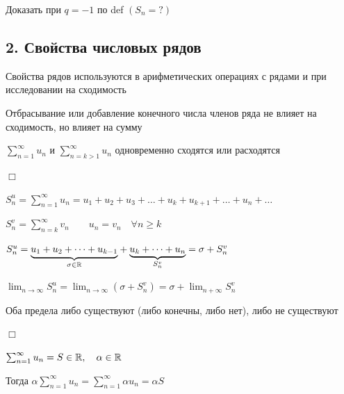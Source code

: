 \documentclass[12pt]{article}
\begin{document}
    \Lab Доказать при $q = -1$ по def $(S_n = ?)$\

    \hypertarget{seriesproperties}{}

    \subsection{2. Свойства числовых рядов}

    \Notas Свойства рядов используются в арифметических операциях с рядами и при исследовании на сходимость

    \begin{MyTheorem}
         Отбрасывание или добавление конечного числа членов ряда не влияет на сходимость, но влияет на сумму

        $\sum_{n = 1}^\infty u_n$ и $\sum_{n = k > 1}^\infty u_n$ одновременно сходятся или расходятся
    \end{MyTheorem}

    \begin{tcolorbox}
        $\Box$

        $S^u_n = \sum_{n = 1}^{\infty} u_n = u_1 + u_2 + u_3 + \dots + u_k + u_{k + 1} + \dots + u_n + \dots$

        $S^v_n = \sum_{n = k}^\infty v_n \quad\quad u_n = v_n \quad \forall n \geq k$

        $S_n^u = \underset{\sigma \in \mathbb{R}}{\underbrace{u_1 + u_2 + \dots + u_{k - 1}}} + \underset{S^v_n}{\underbrace{u_{k} + \dots + u_n}} = \sigma + S^v_n$

        $\lim_{n \to \infty} S_n^u = \lim_{n \to \infty} (\sigma + S^v_n) = \sigma + \lim_{n + \infty} S_n^v$

        \smallvspace

        Оба предела либо существуют (либо конечны, либо нет), либо не существуют



        $\Box$
    \end{tcolorbox}

    \begin{MyTheorem}
         $\sum_{n = 1}^\infty u_n = S \in \mathbb{R}, \quad \alpha \in \mathbb{R}$

        Тогда $\alpha \sum_{n = 1}^\infty u_n = \sum_{n = 1}^\infty \alpha u_n = \alpha S$
    \end{MyTheorem}
\end{document}
